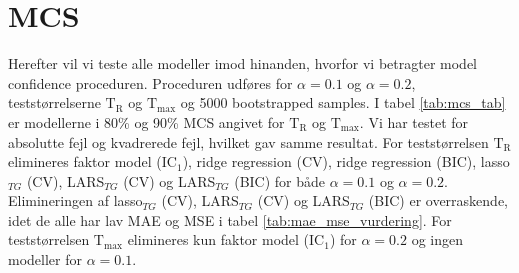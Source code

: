\section{MCS} 
Herefter vil vi teste alle modeller imod hinanden, hvorfor vi betragter model confidence proceduren.
Proceduren udføres for \(\alpha = 0.1\) og \(\alpha = 0.2\), teststørrelserne \(\text{T}_\text{R}\) og \(\text{T}_\text{max}\) og 5000 bootstrapped samples.
I tabel \ref{tab:mcs_tab} er modellerne i 80\% og 90\% MCS angivet for \(\text{T}_\text{R}\) og \(\text{T}_\text{max}\).
Vi har testet for absolutte fejl og kvadrerede fejl, hvilket gav samme resultat.
For teststørrelsen \(\text{T}_\text{R}\) elimineres faktor model (IC\(_1\)), ridge regression (CV), ridge regression (BIC), lasso\(_{TG}\) (CV), LARS\(_{TG}\) (CV) og LARS\(_{TG}\) (BIC) for både \(\alpha = 0.1\) og \(\alpha = 0.2\).
Elimineringen af lasso\(_{TG}\) (CV), LARS\(_{TG}\) (CV) og LARS\(_{TG}\) (BIC) er overraskende, idet de alle har lav MAE og MSE i tabel \ref{tab:mae_mse_vurdering}. 
For teststørrelsen \(\text{T}_\text{max}\) elimineres kun faktor model (IC\(_1\)) for \(\alpha = 0.2\) og ingen modeller for \(\alpha = 0.1\).
\newpage
%

%